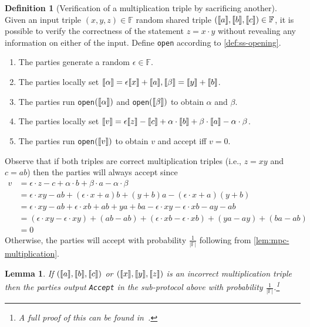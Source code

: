 \documentclass[twoside,11pt]{report}
\theoremstyle{definition}
\newtheorem{definition}{Definition}[section]
\theoremstyle{plain}
\newtheorem{lemma}{Lemma}[section]
\begin{document}
\begin{definition}[Verification of a multiplication triple by sacrificing another]\label{def:sacrifice}
  Given an input triple $(x,y,z) \in \mathbb{F}$ random shared triple $(\llbracket a \rrbracket, \llbracket b \rrbracket, \llbracket c \rrbracket) \in \mathbb{F}$, it is possible to verify the correctness of the statement $z = x \cdot y$ without revealing any information on either of the input. Define \texttt{open} according to \autoref{def:ss-opening}.
  \begin{enumerate}
    \item The parties generate a random $\epsilon \in \mathbb{F}$.
    \item The parties locally set $\llbracket \alpha \rrbracket = \epsilon\llbracket x \rrbracket + \llbracket a \rrbracket, \llbracket \beta \rrbracket = \llbracket y \rrbracket + \llbracket b \rrbracket$.
    \item The parties run \texttt{open}$(\llbracket \alpha \rrbracket)$ and \texttt{open}$(\llbracket \beta \rrbracket)$ to obtain $\alpha$ and $\beta$.
    \item The parties locally set $\llbracket v \rrbracket = \epsilon\llbracket z \rrbracket - \llbracket c \rrbracket + \alpha  \cdot \llbracket b \rrbracket + \beta  \cdot \llbracket a \rrbracket - \alpha  \cdot \beta$.
    \item The parties run \texttt{open}$(\llbracket v \rrbracket)$ to obtain $v$ and accept iff $v = 0$.
  \end{enumerate}
\end{definition}
Observe that if both triples are correct multiplication triples (i.e., $z = xy$ and $c = ab$) then the parties will always accept since
\begin{align}
  v & = \epsilon \cdot z - c + \alpha \cdot b + \beta \cdot a - \alpha \cdot \beta                                            \\
    & = \epsilon \cdot xy - ab + (\epsilon \cdot x + a)b + (y + b)a - (\epsilon \cdot x + a)(y + b)                           \\
    & = \epsilon \cdot xy - ab + \epsilon \cdot xb + ab + ya + ba - \epsilon \cdot xy - \epsilon \cdot xb - ay - ab           \\
    & = (\epsilon \cdot xy - \epsilon \cdot xy) + (ab - ab) + (\epsilon \cdot xb - \epsilon \cdot xb) + (ya - ay) + (ba - ab) \\
    & = 0
\end{align}
Otherwise, the parties will accept with probability $\frac{1}{|\mathbb{F}|}$ following from \autoref{lem:mpc-multiplication}.

\begin{lemma}\label{lem:mpc-multiplication}
  If $(\llbracket a \rrbracket, \llbracket b \rrbracket, \llbracket c \rrbracket)$ or $(\llbracket x \rrbracket, \llbracket y \rrbracket, \llbracket z \rrbracket)$ is an incorrect multiplication triple then the parties output \texttt{Accept} in the sub-protocol above with probability $\frac{1}{|\mathbb{F}|}$.\footnote{A full proof of this can be found in~\cite{baum2020concretely}.}
\end{lemma}
\end{document}
